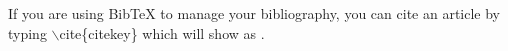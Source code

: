 \documentclass[twocolumn,10pt]{tsfp}
\begin{document}
If you are using BibTeX to manage your bibliography, you can cite an article by typing $\backslash$cite\{citekey\} which will show as \cite{Lee}. \nocite{Kwon} \nocite{Sparrow2} \nocite{Sparrow} \nocite{Tung}



%
%
%
%
%

\end{document}

